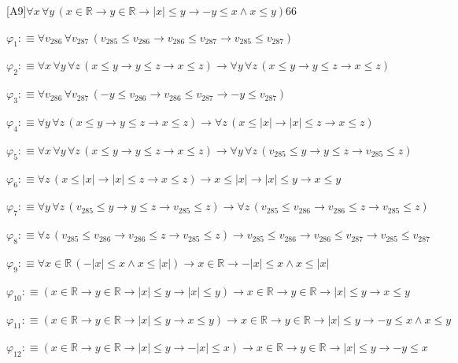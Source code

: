 \begin{fullproof}{[A9]}{$\forall x\,\forall y\,(x \in \mathbb{R} \to y \in \mathbb{R} \to \lvert x \rvert \leq y \to -y \leq x \land x \leq y)$}{66}
\begin{ptree}
\end{ptree}
\begin{abbrevlist}
\item $\varphi_{1} :\equiv \forall v_{286}\,\forall v_{287}\,(v_{285} \leq v_{286} \to v_{286} \leq v_{287} \to v_{285} \leq v_{287})$
\item $\varphi_{2} :\equiv \forall x\,\forall y\,\forall z\,(x \leq y \to y \leq z \to x \leq z) \to \forall y\,\forall z\,(x \leq y \to y \leq z \to x \leq z)$
\item $\varphi_{3} :\equiv \forall v_{286}\,\forall v_{287}\,(-y \leq v_{286} \to v_{286} \leq v_{287} \to -y \leq v_{287})$
\item $\varphi_{4} :\equiv \forall y\,\forall z\,(x \leq y \to y \leq z \to x \leq z) \to \forall z\,(x \leq \lvert x \rvert \to \lvert x \rvert \leq z \to x \leq z)$
\item $\varphi_{5} :\equiv \forall x\,\forall y\,\forall z\,(x \leq y \to y \leq z \to x \leq z) \to \forall y\,\forall z\,(v_{285} \leq y \to y \leq z \to v_{285} \leq z)$
\item $\varphi_{6} :\equiv \forall z\,(x \leq \lvert x \rvert \to \lvert x \rvert \leq z \to x \leq z) \to x \leq \lvert x \rvert \to \lvert x \rvert \leq y \to x \leq y$
\item $\varphi_{7} :\equiv \forall y\,\forall z\,(v_{285} \leq y \to y \leq z \to v_{285} \leq z) \to \forall z\,(v_{285} \leq v_{286} \to v_{286} \leq z \to v_{285} \leq z)$
\item $\varphi_{8} :\equiv \forall z\,(v_{285} \leq v_{286} \to v_{286} \leq z \to v_{285} \leq z) \to v_{285} \leq v_{286} \to v_{286} \leq v_{287} \to v_{285} \leq v_{287}$
\item $\varphi_{9} :\equiv \forall x \in \mathbb{R}\,(-\lvert x \rvert \leq x \land x \leq \lvert x \rvert) \to x \in \mathbb{R} \to -\lvert x \rvert \leq x \land x \leq \lvert x \rvert$
\item $\varphi_{10} :\equiv (x \in \mathbb{R} \to y \in \mathbb{R} \to \lvert x \rvert \leq y \to \lvert x \rvert \leq y) \to x \in \mathbb{R} \to y \in \mathbb{R} \to \lvert x \rvert \leq y \to x \leq y$
\item $\varphi_{11} :\equiv (x \in \mathbb{R} \to y \in \mathbb{R} \to \lvert x \rvert \leq y \to x \leq y) \to x \in \mathbb{R} \to y \in \mathbb{R} \to \lvert x \rvert \leq y \to -y \leq x \land x \leq y$
\item $\varphi_{12} :\equiv (x \in \mathbb{R} \to y \in \mathbb{R} \to \lvert x \rvert \leq y \to -\lvert x \rvert \leq x) \to x \in \mathbb{R} \to y \in \mathbb{R} \to \lvert x \rvert \leq y \to -y \leq x$

\end{abbrevlist}
\end{fullproof}
